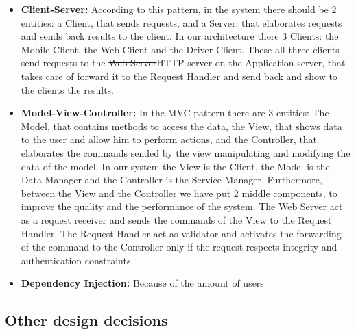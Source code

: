 \begin{itemize}
\item {\textbf{Client-Server:}} According to this pattern, in the system there should be 2 entities: a Client, that sends requests, and a Server, that elaborates requests and sends back results to the client. In our architecture there 3 Clients: the Mobile Client, the Web Client and the Driver Client. These all three  clients send requests to the \st{Web Server}HTTP server on the Application server, that takes care of forward it to the Request Handler and send back and show to the clients the results.


\item{\textbf{Model-View-Controller:}} In the MVC pattern there are 3 entities: The Model, that contains methods to access the data, the View, that shows data to the user and allow him to perform actions, and the Controller, that elaborates the commands sended by the view manipulating and modifying  the data of the model.
In our system the View is the Client, the Model is the Data Manager and the Controller is the Service Manager. Furthermore, between the View and the Controller we have put 2 middle components, to improve the quality and the performance of the system. The Web Server act as a request receiver and sends the commands of the View to the Request Handler. The Request Handler act as validator and activates the forwarding of the command to the Controller only if the request respects integrity and authentication constraints.

\item{\textbf{Dependency Injection:}} Because of the amount of users  

\end{itemize}



\subsection{Other design decisions }